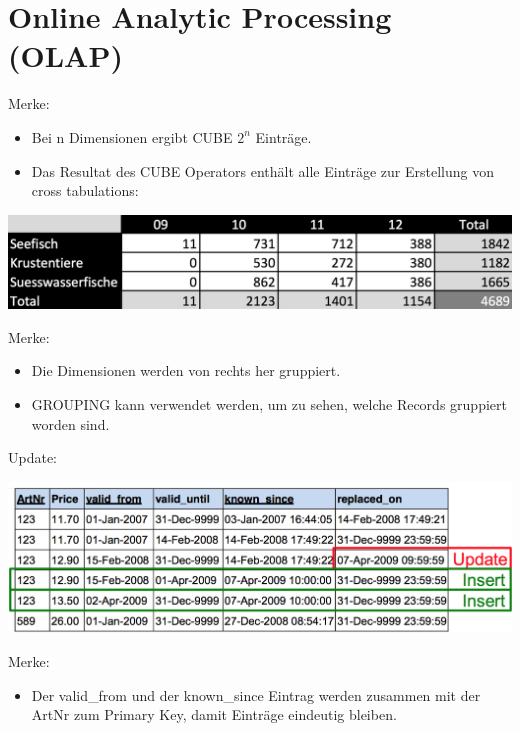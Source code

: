 
\section{Online Analytic Processing (OLAP)}


\begin{breakbox}
Merke:
\begin{itemize}
	\item Bei n Dimensionen ergibt CUBE $2^n$ Einträge.
	\item Das Resultat des CUBE Operators enthält alle Einträge zur Erstellung von cross tabulations:
\end{itemize}
\begin{center}
\includegraphics[width=.15\textwidth]{slides_images/cross_tabulation.png}
\end{center}
\end{breakbox}

\begin{breakbox}
Merke:
\begin{itemize}
	\item Die Dimensionen werden von rechts her gruppiert.
	\item GROUPING kann verwendet werden, um zu sehen, welche Records gruppiert worden sind.
\end{itemize}
\end{breakbox}

\begin{breakbox}
\newline Update:
\begin{center}
\includegraphics[width=.15\textwidth]{slides_images/bi_temporal_update.png}
\end{center}
Merke:
\begin{itemize}
	\item Der valid\_from und der known\_since Eintrag werden zusammen mit der ArtNr zum Primary Key, damit Einträge eindeutig bleiben.
\end{itemize}
\end{breakbox}


